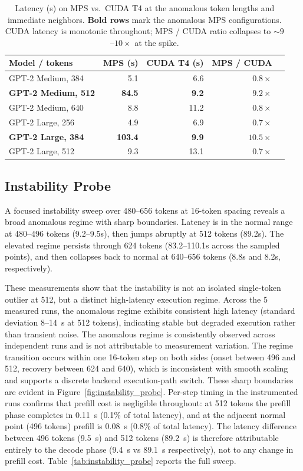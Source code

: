 \documentclass{article}
\begin{document}
\begin{table}[h]
\centering
\caption{Latency (s) on MPS vs.\ CUDA T4 at the anomalous token lengths and immediate neighbors. \textbf{Bold rows} mark the anomalous MPS configurations. CUDA latency is monotonic throughout; MPS / CUDA ratio collapses to ${\sim}9$--$10\times$ at the spike.}
\label{tab:cuda_comparison}
\begin{tabular}{lrrrr}
\toprule
Model / tokens & MPS (s) & CUDA T4 (s) & MPS / CUDA \\
\midrule
GPT-2 Medium, 384     &   5.1  &  6.6  & $0.8\times$ \\
\textbf{GPT-2 Medium, 512} & \textbf{84.5} & \textbf{9.2}  & $\mathbf{9.2\times}$ \\
GPT-2 Medium, 640     &   8.8  & 11.2  & $0.8\times$ \\
\midrule
GPT-2 Large, 256      &   4.9  &  6.9  & $0.7\times$ \\
\textbf{GPT-2 Large, 384}  & \textbf{103.4} & \textbf{9.9}  & $\mathbf{10.5\times}$ \\
GPT-2 Large, 512      &   9.3  & 13.1  & $0.7\times$ \\
\bottomrule
\end{tabular}
\end{table}

\subsection{Instability Probe}

A focused instability sweep over 480--656 tokens at 16-token spacing reveals a broad anomalous regime with sharp boundaries.
Latency is in the normal range at 480--496 tokens (9.2--9.5s), then jumps abruptly at 512 tokens (89.2s).
The elevated regime persists through 624 tokens (83.2--110.1s across the sampled points), and then collapses back to normal at 640--656 tokens (8.8s and 8.2s, respectively).

These measurements show that the instability is not an isolated single-token outlier at 512, but a distinct high-latency execution regime.
Across the 5 measured runs, the anomalous regime exhibits consistent high latency (standard deviation 8--14~s at 512 tokens), indicating stable but degraded execution rather than transient noise. The anomalous regime is consistently observed across independent runs and is not attributable to measurement variation.
The regime transition occurs within one 16-token step on both sides (onset between 496 and 512, recovery between 624 and 640), which is inconsistent with smooth scaling and supports a discrete backend execution-path switch. These sharp boundaries are evident in Figure~\ref{fig:instability_probe}.
Per-step timing in the instrumented runs confirms that prefill cost is negligible throughout: at 512 tokens the prefill phase completes in 0.11~s (0.1\% of total latency), and at the adjacent normal point (496 tokens) prefill is 0.08~s (0.8\% of total latency).
The latency difference between 496 tokens (9.5~s) and 512 tokens (89.2~s) is therefore attributable entirely to the decode phase (9.4~s vs 89.1~s respectively), not to any change in prefill cost.
Table~\ref{tab:instability_probe} reports the full sweep.
\end{document}
